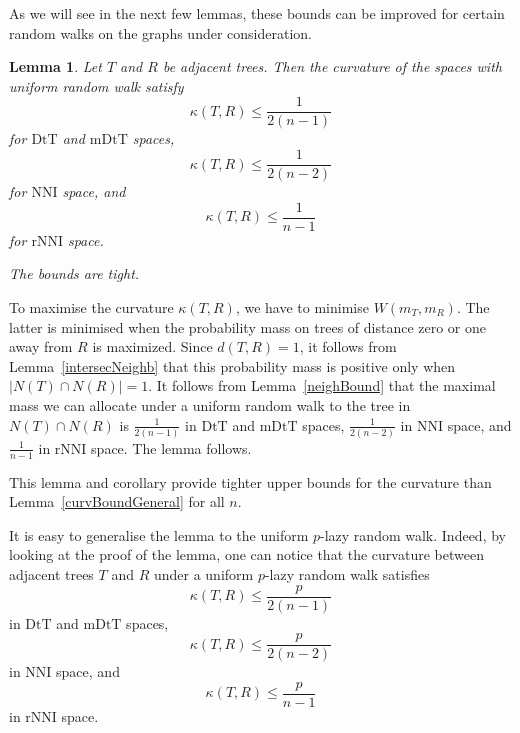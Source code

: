 \documentclass{amsart}
\newtheorem{lemma}{Lemma}
\newcommand{\dts}{\mathrm{DtT}}
\newcommand{\nni}{\mathrm{NNI}}
\newcommand{\rnni}{\mathrm{rNNI}}
\newcommand{\mdts}{\mathrm{mDtT}}
\begin{document}
As we will see in the next few lemmas, these bounds can be improved for certain random walks on the graphs under consideration.

\begin{lemma}\label{uniformUpper}
Let $T$ and $R$ be adjacent trees.
Then the curvature of the spaces with uniform random walk satisfy
\[
\kappa(T,R) \leq \dfrac{1}{2(n-1)}
\]
for $\dts$ and $\mdts$ spaces,
\[
\kappa(T,R) \leq \dfrac{1}{2(n-2)}
\]
for $\nni$ space, and
\[
\kappa(T,R) \leq \dfrac{1}{n-1}
\]
for $\rnni$ space.

The bounds are tight.
\end{lemma}

\proof
To maximise the curvature $\kappa(T,R)$, we have to minimise $W(m_T,m_R)$.
The latter is minimised when the probability mass on trees of distance zero or one away from $R$ is maximized.
Since $d(T,R) = 1$, it follows from Lemma~\ref{intersecNeighb} that this probability mass is positive only when $|N(T) \cap N(R)| = 1$. 
It follows from Lemma~\ref{neighBound} that the maximal mass we can allocate under a uniform random walk to the tree in $N(T) \cap N(R)$ is $\frac{1}{2(n-1)}$ in $\dts$ and $\mdts$ spaces, $\frac{1}{2(n-2)}$ in $\nni$ space, and $\frac{1}{n-1}$ in $\rnni$ space.
The lemma follows.
\endproof


This lemma and corollary provide tighter upper bounds for the curvature than Lemma~\ref{curvBoundGeneral} for all $n$.

It is easy to generalise the lemma to the uniform $p$-lazy random walk.
Indeed, by looking at the proof of the lemma, one can notice that the curvature between adjacent trees $T$ and $R$ under a uniform $p$-lazy random walk satisfies
\[
\kappa(T,R) \leq \frac{p}{2(n-1)}
\]
in $\dts$ and $\mdts$ spaces,
\[
\kappa(T,R) \leq \frac{p}{2(n-2)}
\]
in $\nni$ space, and
\[
\kappa(T,R) \leq \frac{p}{n-1}
\]
in $\rnni$ space.

\end{document}
